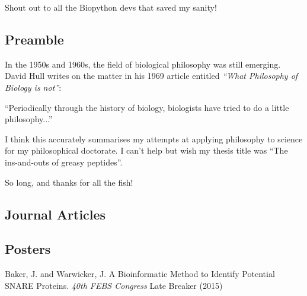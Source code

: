 \documentclass[12pt,PhD,twoside]{muthesis}
\begin{document}
Shout out to all the Biopython devs that saved my sanity!

\subsection*{Preamble} %
In the 1950s and 1960s, the field of biological philosophy was still emerging. David Hull writes on the matter in his 1969 article entitled {\it``What Philosophy of Biology is not''}:

\begin{displayquote}
``Periodically through the history of biology, biologists have tried to do
a little philosophy...'' \cite{Hull1969}
\end{displayquote}

I think this accurately summarises my attempts at applying philosophy to science for my philosophical doctorate. I can't help but wish my thesis title was ``The ins-and-outs of greasy peptides''.

So long, and thanks for all the fish!


\subsection*{Journal Articles} %

\subsection*{Posters}
Baker, J. and Warwicker, J. A Bioinformatic Method to Identify Potential SNARE Proteins. {\it 40th FEBS Congress} Late Breaker (2015)

\afterpreface %








\printglossary[type=\acronymtype,title=Abbreviations]
\printglossary[title=Nomenclature] %

\printbibliography[title={Bibliography}]

\end{document}
